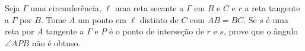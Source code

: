 Seja $\Gamma$ uma circunferência, $\ell$ uma reta secante a $\Gamma$ em $B$ e $C$ e $r$ a reta tangente a $\Gamma$ por $B$. Tome $A$ um ponto em $\ell$ distinto de $C$ com $AB = BC$. Se $s$ é uma reta por $A$ tangente a $\Gamma$ e $P$ é o ponto de interseção de $r$ e $s$, prove que o ângulo $\angle APB$ não é obtuso.
